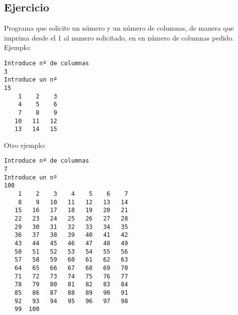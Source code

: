 \documentclass[4paper]{article}
\begin{document}
\subsection{Ejercicio }
Programa que solicite un número y un número de columnas, de manera que imprima desde el 1 al numero solicitado, en en número de columnas pedido. Ejemplo:
\begin{verbatim}
Introduce nº de columnas
3
Introduce un nº
15
    1    2    3
    4    5    6
    7    8    9
   10   11   12
   13   14   15
\end{verbatim}
Otro ejemplo:
\begin{verbatim}
Introduce nº de columnas
7
Introduce un nº
100
    1    2    3    4    5    6    7
    8    9   10   11   12   13   14
   15   16   17   18   19   20   21
   22   23   24   25   26   27   28
   29   30   31   32   33   34   35
   36   37   38   39   40   41   42
   43   44   45   46   47   48   49
   50   51   52   53   54   55   56
   57   58   59   60   61   62   63
   64   65   66   67   68   69   70
   71   72   73   74   75   76   77
   78   79   80   81   82   83   84
   85   86   87   88   89   90   91
   92   93   94   95   96   97   98
   99  100
\end{verbatim}
\end{document}

